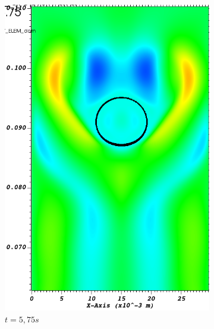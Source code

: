 \begin{figure}[H]
\begin{subfigure}[ht!]{0.23\textwidth}
		\includegraphics[width=1\textwidth]{fig_plateau_vitesse/visit0016.png}
		\caption{$t=5,75s$}
		\label{fig:three sin x}
	\end{subfigure}
	\begin{subfigure}[ht!]{0.23\textwidth}
		\centering

\end{subfigure}
\end{figure}
